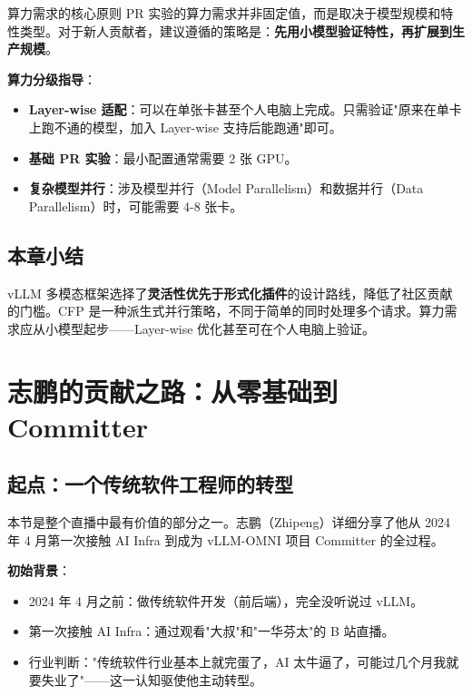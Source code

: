 \documentclass[a4paper]{article}
\begin{document}
\begin{importantbox}{算力需求的核心原则}
PR 实验的算力需求并非固定值，而是取决于模型规模和特性类型。对于新人贡献者，建议遵循的策略是：\textbf{先用小模型验证特性，再扩展到生产规模}。
\end{importantbox}

\textbf{算力分级指导}：

\begin{itemize}
\item \textbf{Layer-wise 适配}：可以在单张卡甚至个人电脑上完成。只需验证"原来在单卡上跑不通的模型，加入 Layer-wise 支持后能跑通"即可。
\item \textbf{基础 PR 实验}：最小配置通常需要 2 张 GPU。
\item \textbf{复杂模型并行}：涉及模型并行（Model Parallelism）和数据并行（Data Parallelism）时，可能需要 4-8 张卡。
\end{itemize}

\subsection{本章小结}

vLLM 多模态框架选择了\textbf{灵活性优先于形式化插件}的设计路线，降低了社区贡献的门槛。CFP 是一种派生式并行策略，不同于简单的同时处理多个请求。算力需求应从小模型起步——Layer-wise 优化甚至可在个人电脑上验证。

\newpage

\section{志鹏的贡献之路：从零基础到 Committer}

\subsection{起点：一个传统软件工程师的转型}

本节是整个直播中最有价值的部分之一。志鹏（Zhipeng）详细分享了他从 2024 年 4 月第一次接触 AI Infra 到成为 vLLM-OMNI 项目 Committer 的全过程。

\textbf{初始背景}：

\begin{itemize}
\item 2024 年 4 月之前：做传统软件开发（前后端），完全没听说过 vLLM。
\item 第一次接触 AI Infra：通过观看"大叔"和"一华芬太"的 B 站直播。
\item 行业判断："传统软件行业基本上就完蛋了，AI 太牛逼了，可能过几个月我就要失业了"——这一认知驱使他主动转型。
\end{itemize}
\end{document}
